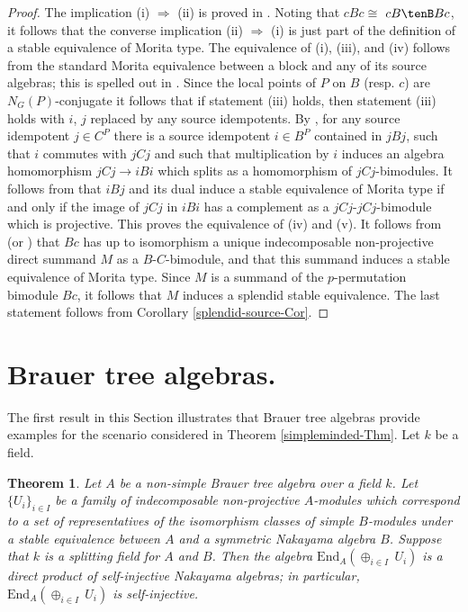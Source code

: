 \documentclass{amsart}
\theoremstyle{plain}\newtheorem{Theorem}{Theorem}[section]
\theoremstyle{plain}\newtheorem{Conjecture}[Theorem]{Conjecture}
\theoremstyle{plain}\newtheorem{Corollary}[Theorem]{Corollary}
\theoremstyle{plain}\newtheorem{Lemma}[Theorem]{Lemma}
\theoremstyle{plain}\newtheorem{Proposition}[Theorem]{Proposition}
\theoremstyle{definition}\newtheorem{Definition}[Theorem]{Definition}
\theoremstyle{definition}\newtheorem{Example}[Theorem]{Example}
\theoremstyle{definition}\newtheorem{Examples}[Theorem]{Examples}
\theoremstyle{definition}\newtheorem{Exercise}[Theorem]{Exercise}
\theoremstyle{definition}\newtheorem{Notation}[Theorem]{Notation}
\theoremstyle{definition}\newtheorem{Remark}[Theorem]{Remark}
\theoremstyle{definition}\newtheorem{Remarks}[Theorem]{Remarks}
\theoremstyle{plain}\newtheorem{Statement}[Theorem]{}
\def\End{\mathrm{End}}
\begin{document}
\begin{proof}
The implication (i) $\Rightarrow$ (ii) is proved in \cite[Proposition 9.8.3]{LiBookII}.
Noting that $cBc\cong$ $cB\tenB Bc$, it follows that the converse implication 
(ii) $\Rightarrow$ (i) is just part of the definition of
a stable equivalence of Morita type. The equivalence of (i), (iii), and (iv) follows
from the standard Morita equivalence between a block and any of its source
algebras; this is spelled out in \cite[Theorem 9.8.2]{LiBookII}.
Since the local points of $P$ on $B$ (resp. $c$) are $N_G(P)$-conjugate it follows that
if statement (iii) holds, then statement (iii) holds with $i$, $j$ replaced by any source 
idempotents.  
By \cite[Theorem 6.15.1]{LiBookII}, for any source idempotent
$j\in C^P$ there is a source idempotent $i\in B^P$ contained in $jBj$, such that
$i$ commutes with $jCj$ and such that multiplication by $i$ induces an
algebra homomorphism $jCj\to iBi$ which splits as a homomorphism of
$jCj$-bimodules. It follows from \cite[Proposition 9.8.4]{LiBookII} that
$iBj$ and its dual induce a stable equivalence of Morita type if and only
if the image of $jCj$ in $iBi$ has a complement as a $jCj$-$jCj$-bimodule
which is projective. This proves the equivalence of (iv) and (v).
It follows from \cite[2.4]{Listable} (or \cite[Theorem 4.14.2]{LiBookI}) 
that $Bc$ has up to isomorphism a unique indecomposable
non-projective  direct summand $M$ as a $B$-$C$-bimodule, and that this 
summand induces a stable equivalence of Morita type. Since $M$ is a
summand of the $p$-permutation bimodule  $Bc$, it follows that $M$ induces
a splendid stable equivalence. The last statement follows from
Corollary \ref{splendid-source-Cor}.
\end{proof}


\section{Brauer tree algebras.} 
\label{Brauertree-section} %

The first result in this Section illustrates that Brauer tree algebras provide 
examples for the scenario considered in Theorem \ref{simpleminded-Thm}.
Let $k$ be a field.

\begin{Theorem} \label{Brauertree-thm}
Let $A$ be a non-simple Brauer tree algebra over a field $k$. Let $\{U_i\}_{i\in I}$ 
be a  family of indecomposable non-projective $A$-modules which correspond
to a set of representatives of the isomorphism classes of simple $B$-modules
under a stable equivalence between $A$ and a symmetric Nakayama algebra $B$.
Suppose that $k$ is a splitting field for $A$ and $B$.
Then the algebra $\End_A(\oplus_{i\in I}\ U_i)$ is a direct product of
self-injective Nakayama algebras; in particular, $\End_A(\oplus_{i\in I}\ U_i)$
is self-injective.
\end{Theorem} 
\end{document}

